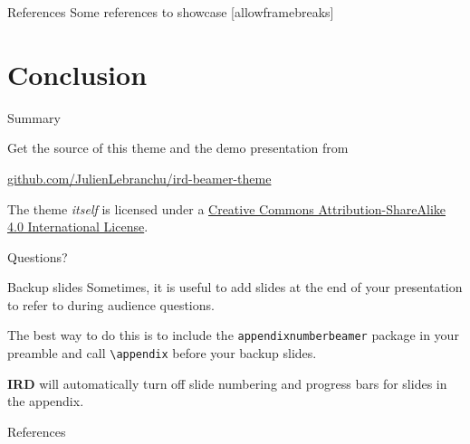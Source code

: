 \documentclass[12pt,aspectratio=169]{beamer}
\newcommand{\themename}{\textbf{\textsc{IRD}}\xspace}
\begin{document}
\begin{frame}{References}
  Some references to showcase [allowframebreaks] \cite{knuth92,ConcreteMath,Simpson,Er01,greenwade93}
\end{frame}

\section{Conclusion}

\begin{frame}{Summary}

  Get the source of this theme and the demo presentation from

  \begin{center}\url{github.com/JulienLebranchu/ird-beamer-theme}\end{center}

  The theme \emph{itself} is licensed under a
  \href{http://creativecommons.org/licenses/by-sa/4.0/}{Creative Commons
  Attribution-ShareAlike 4.0 International License}.

  \begin{center}\ccbysa\end{center}

\end{frame}

\begin{frame}[standout]
  Questions?
\end{frame}


\appendix

\begin{frame}[fragile]{Backup slides}
  Sometimes, it is useful to add slides at the end of your presentation to
  refer to during audience questions.

  The best way to do this is to include the \verb|appendixnumberbeamer|
  package in your preamble and call \verb|\appendix| before your backup slides.

  \themename will automatically turn off slide numbering and progress bars for
  slides in the appendix.
\end{frame}

\begin{frame}[allowframebreaks]{References}

  
  

\end{frame}
\end{document}
